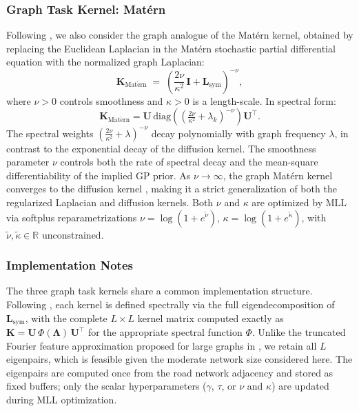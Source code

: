 \documentclass[11pt]{article}
\begin{document}

\subsubsection{Graph Task Kernel: Mat\'{e}rn}
\label{subsec:matern-kernel}

Following \textcite{borovitskiy2021matern}, we also consider the graph
analogue of the Mat\'{e}rn kernel, obtained by replacing the Euclidean
Laplacian in the Mat\'{e}rn stochastic partial differential equation with the normalized graph Laplacian:
\begin{equation}
    \mathbf{K}_{\mathrm{Mat\acute{e}rn}}
    \;=\;
    \left(\frac{2\nu}{\kappa^2}\,\mathbf{I} + \mathbf{L}_{\mathrm{sym}}
    \right)^{-\nu},
    \label{eq:matern-kernel}
\end{equation}
where $\nu > 0$ controls smoothness and $\kappa > 0$ is a length-scale.
In spectral form:
\begin{equation}
    \mathbf{K}_{\mathrm{Mat\acute{e}rn}}
    = \mathbf{U}
      \,\mathrm{diag}\!\left(
      \left(\tfrac{2\nu}{\kappa^2} + \lambda_k\right)^{-\nu}
      \right)
      \mathbf{U}^\top.
    \label{eq:matern-kernel-spectral}
\end{equation}
The spectral weights $\left(\frac{2\nu}{\kappa^2}+\lambda\right)^{-\nu}$
decay polynomially with graph frequency $\lambda$, in contrast to the
exponential decay of the diffusion kernel. The smoothness parameter
$\nu$ controls both the rate of spectral decay and the mean-square
differentiability of the implied GP prior. As $\nu \to \infty$, the
graph Mat\'{e}rn kernel converges to the diffusion kernel
\parencite{borovitskiy2021matern}, making it a strict generalization
of both the regularized Laplacian and diffusion kernels. Both $\nu$
and $\kappa$ are optimized by MLL via softplus reparametrizations
$\nu = \log(1+e^{\tilde{\nu}})$, $\kappa = \log(1+e^{\tilde{\kappa}})$,
with $\tilde{\nu}, \tilde{\kappa} \in \mathbb{R}$ unconstrained.


\subsubsection{Implementation Notes}
\label{subsec:graph-kernel-implementation}

The three graph task kernels share a common implementation structure.
Following \textcite{borovitskiy2021matern}, each kernel is defined
spectrally via the full eigendecomposition of $\mathbf{L}_{\mathrm{sym}}$,
with the complete $L \times L$ kernel matrix computed exactly as
$\mathbf{K} = \mathbf{U}\,\Phi(\boldsymbol{\Lambda})\,\mathbf{U}^\top$
for the appropriate spectral function $\Phi$. Unlike the truncated
Fourier feature approximation proposed for large graphs in
\textcite{borovitskiy2021matern}, we retain all $L$ eigenpairs, which
is feasible given the moderate network size considered here. The
eigenpairs are computed once from the road network adjacency and stored
as fixed buffers; only the scalar hyperparameters ($\gamma$, $\tau$,
or $\nu$ and $\kappa$) are updated during MLL optimization.
\end{document}
